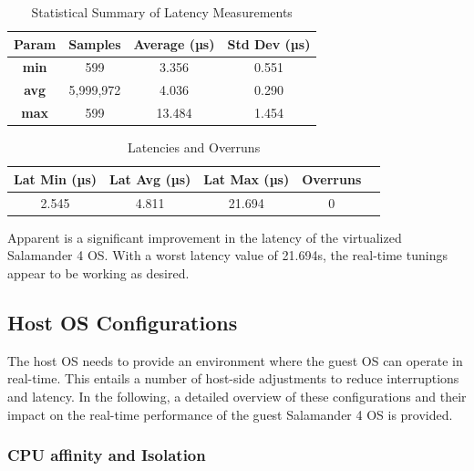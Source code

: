 \documentclass[MMR,Master,english]{twbook}
\begin{document}
\begin{table}[H]
	\centering
	\caption{Statistical Summary of Latency Measurements}
	\label{tab:latency_stats_kernelparam}
	\begin{tabular}{|c|c|c|c|}
		\hline
		\textbf{Param} & \textbf{Samples} & \textbf{Average (µs)} & \textbf{Std Dev (µs)} \\ \hline
		\textbf{min}   & 599              & 3.356                 & 0.551                 \\ \hline
		\textbf{avg}   & 5,999,972        & 4.036                 & 0.290                 \\ \hline
		\textbf{max}   & 599              & 13.484                & 1.454                 \\ \hline
	\end{tabular}
\end{table}

\begin{table}[H]
	\centering
	\caption{Latencies and Overruns}
	\label{tab:latency_overrun_msw_new_virt_kernel}
	\begin{tabular}{|c|c|c|c|c|}
		\hline
		\textbf{Lat Min (µs)} & \textbf{Lat Avg (µs)} & \textbf{Lat Max (µs)} & \textbf{Overruns} \\ \hline
		2.545                 & 4.811                 & 21.694                & 0                 \\ \hline
	\end{tabular}
\end{table}

\noindent Apparent is a significant improvement in the latency of the virtualized Salamander 4 OS. With a worst latency value of 21.694\textmu s, the real-time tunings appear to be working as desired.

\clearpage

\subsection{Host OS Configurations}\label{subsec:host_configurations}
The host OS needs to provide an environment where the guest OS can operate in real-time. This entails a number of host-side adjustments to reduce interruptions and latency. In the following, a detailed overview of these configurations and their impact on the real-time performance of the guest Salamander 4 OS is provided.
\subsubsection{CPU affinity and Isolation}\label{subsubsec:cpu_isolation}
\end{document}
